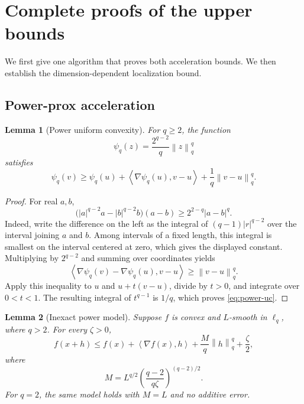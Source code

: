 \documentclass[11pt]{article}
\newcommand{\ip}[2]{\left\langle #1,#2\right\rangle}
\newcommand{\norm}[2]{\left\lVert #1\right\rVert_{#2}}
\newtheorem{lemma}[lemma]{Lemma}
\theoremstyle{definition}
\theoremstyle{remark}
\begin{document}
\section{Complete proofs of the upper bounds}
\label{app:upper-proofs}

We first give one algorithm that proves both acceleration bounds.
We then establish the dimension-dependent localization bound.

\subsection{Power-prox acceleration}

\begin{lemma}[Power uniform convexity]
\label{lem:power-uniform-convexity}
For $q\ge2$, the function
\[
 \psi_q(z)=\frac{2^{q-2}}q\norm{z}{q}^q
\]
satisfies
\begin{equation}
\label{eq:power-uc}
 \psi_q(v)\ge\psi_q(u)+\ip{\nabla\psi_q(u)}{v-u}
                       +\frac1q\norm{v-u}{q}^q.
\end{equation}
\end{lemma}

\begin{proof}
For real $a,b$,
\begin{equation}
\label{eq:scalar-monotonicity}
 \bigl(|a|^{q-2}a-|b|^{q-2}b\bigr)(a-b)
 \ge2^{2-q}|a-b|^q.
\end{equation}
Indeed, write the difference on the left as the integral of
$(q-1)|r|^{q-2}$ over the interval joining $a$ and $b$.
Among intervals of a fixed length, this integral is smallest on the
interval centered at zero, which gives the displayed constant.
Multiplying by $2^{q-2}$ and summing over coordinates yields
\[
 \ip{\nabla\psi_q(v)-\nabla\psi_q(u)}{v-u}
 \ge\norm{v-u}{q}^q.
\]
Apply this inequality to $u$ and $u+t(v-u)$, divide by $t>0$, and
integrate over $0<t<1$.  The resulting integral of $t^{q-1}$ is $1/q$,
which proves \cref{eq:power-uc}.
\end{proof}

\begin{lemma}[Inexact power model]
\label{lem:inexact-power-model}
Suppose $f$ is convex and $L$-smooth in $\ell_q$, where $q>2$.
For every $\zeta>0$,
\begin{equation}
\label{eq:inexact-power-model}
 f(x+h)\le f(x)+\ip{\nabla f(x)}{h}
                  +\frac Mq\norm{h}{q}^q+\frac\zeta2,
\end{equation}
where
\begin{equation}
\label{eq:M-power-model}
 M=L^{q/2}\left(\frac{q-2}{q\zeta}\right)^{(q-2)/2}.
\end{equation}
For $q=2$, the same model holds with $M=L$ and no additive error.
\end{lemma}
\end{document}
